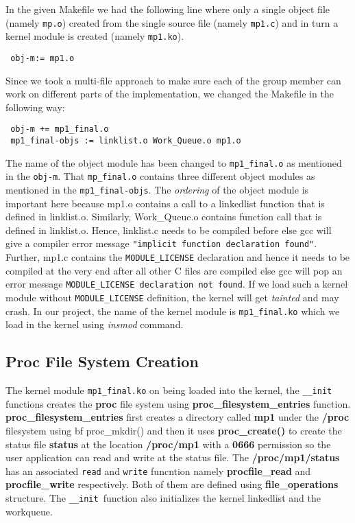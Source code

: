 \documentclass[11pt]{article}
\begin{document}
In the given Makefile we had the following line where only a single object file (namely {\tt mp.o}) created from the single source file (namely {\tt mp1.c}) and in turn a kernel module is created (namely {\tt mp1.ko}).
\begin{verbatim}
 obj-m:= mp1.o
\end{verbatim}
Since we took a multi-file approach to make sure each of the group member can work on different parts of the implementation, we changed the Makefile in the following way:
\begin{verbatim}
 obj-m += mp1_final.o
 mp1_final-objs := linklist.o Work_Queue.o mp1.o
\end{verbatim}
The name of the object module has been changed to {\tt mp1\_final.o} as mentioned in the {\tt obj-m}. That {\tt mp\_final.o} contains three different object modules as mentioned in the {\tt mp1\_final-objs}. The {\em ordering} of the object module is important here because mp1.o contains a call to a linkedlist function that is defined in linklist.o. Similarly, Work\_Queue.o contains function call that is defined in linklist.o. Hence, linklist.c needs to be compiled before else gcc will give a compiler error message {\tt "implicit function declaration found"}. Further, mp1.c contains the {\tt MODULE\_LICENSE} declaration and hence it needs to be compiled at the very end after all other C files are compiled else gcc will pop an error message {\tt MODULE\_LICENSE declaration not found}. If we load such a kernel module without {\tt MODULE\_LICENSE} definition, the kernel will get {\em tainted} and may crash. In our project, the name of the kernel module is {\tt mp1\_final.ko} which we load in the kernel using {\em insmod} command.

\subsection{Proc File System Creation}\label{subsec:Proc}

The kernel module {\tt mp1\_final.ko} on being loaded into the kernel, the {\tt \_\_init} functions creates the {\bf proc} file system using {\bf proc\_filesystem\_entries} function. {\bf proc\_filesystem\_entries} first creates a directory called {\bf mp1} under the {\bf /proc} filesystem using {bf proc\_mkdir()} and then it uses {\bf proc\_create()} to create the status file {\bf status} at the location {\bf /proc/mp1} with a {\bf 0666} permission so the user application can read and write at the status file. The {\bf /proc/mp1/status} has an associated {\tt read} and {\tt write} funcntion namely {\bf procfile\_read} and {\bf procfile\_write} respectively. Both of them are defined using {\bf file\_operations} structure. The {\tt \_\_init}~function also initializes the kernel linkedlist and the workqueue.
\end{document}
